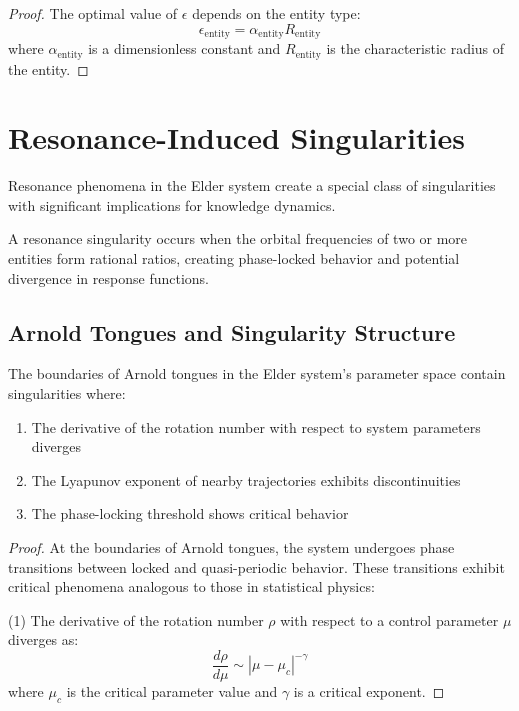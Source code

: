 \begin{definition}
\begin{enumerate}
\begin{proof}
The optimal value of $\epsilon$ depends on the entity type:
\begin{equation}
\epsilon_{\text{entity}} = \alpha_{\text{entity}} R_{\text{entity}}
\end{equation}
where $\alpha_{\text{entity}}$ is a dimensionless constant and $R_{\text{entity}}$ is the characteristic radius of the entity.
\end{proof}

\section{Resonance-Induced Singularities}

Resonance phenomena in the Elder system create a special class of singularities with significant implications for knowledge dynamics.

\begin{definition}
A resonance singularity occurs when the orbital frequencies of two or more entities form rational ratios, creating phase-locked behavior and potential divergence in response functions.
\end{definition}

\subsection{Arnold Tongues and Singularity Structure}

\begin{theorem}
The boundaries of Arnold tongues in the Elder system's parameter space contain singularities where:
\begin{enumerate}
    \item The derivative of the rotation number with respect to system parameters diverges
    \item The Lyapunov exponent of nearby trajectories exhibits discontinuities
    \item The phase-locking threshold shows critical behavior
\end{enumerate}
\end{theorem}

\begin{proof}
At the boundaries of Arnold tongues, the system undergoes phase transitions between locked and quasi-periodic behavior. These transitions exhibit critical phenomena analogous to those in statistical physics:

(1) The derivative of the rotation number $\rho$ with respect to a control parameter $\mu$ diverges as:
\begin{equation}
\frac{d\rho}{d\mu} \sim |\mu - \mu_c|^{-\gamma}
\end{equation}
where $\mu_c$ is the critical parameter value and $\gamma$ is a critical exponent.


\end{proof}
\end{enumerate}
\end{definition}
